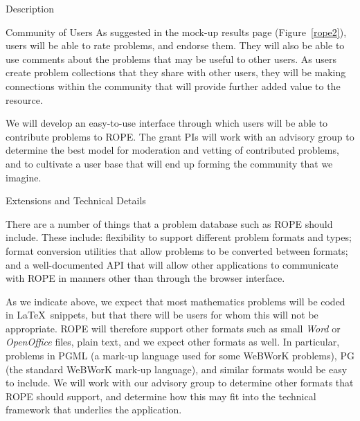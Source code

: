 \documentclass[11pt]{article}
\begin{document}
\begin{section}{Description}
\begin{subsection}{Community of Users}
As suggested in the mock-up results page (Figure~\ref{rope2}), users will
be able to rate problems, and endorse them.  They will also be
able to use comments about the problems that may be useful to other
users.  As users create problem collections that they share
with other users, they will be making connections within the community
that will provide further added value to the resource.  

We will develop an easy-to-use interface through which 
users will be able to contribute
problems to ROPE.  The grant PIs will work with an advisory group to
determine the best model for moderation and vetting of contributed
problems, and to cultivate a user base that will end up forming the
community that we imagine.

\end{subsection}

\begin{subsection}{Extensions and Technical Details}

There are a number of things that a problem database such as ROPE should
include.  These include: flexibility to support different problem formats
and types; format conversion utilities that allow problems to be converted
between formats; and a well-documented API that will allow other
applications to communicate with ROPE in manners other than through the
browser interface.

As we indicate above, we expect that most mathematics problems will be
coded in \LaTeX\ snippets, but that there will be users for whom this will
not be appropriate.  ROPE will therefore support other formats such as
small \emph{Word} or \emph{OpenOffice} files, plain text, and we expect
other formats as well.  In particular, problems in PGML (a mark-up
language used for some 
WeBWorK problems), PG (the standard WeBWorK mark-up language), and similar
formats would be easy to include.  We will work with our advisory group to
determine other formats that ROPE should support, and determine how this
may fit into the technical framework that underlies the application.


\end{subsection}
\end{section}
\end{document}
